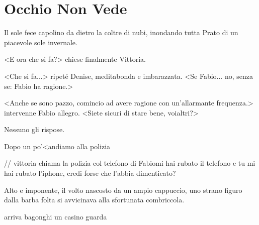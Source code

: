 \chapter{Occhio Non Vede}

Il sole fece capolino da dietro la coltre di nubi, inondando tutta Prato di un piacevole sole invernale.

<E ora che si fa?> chiese finalmente Vittoria.

<Che si fa...> ripeté Denise, meditabonda e imbarazzata. <Se Fabio... no, senza se: Fabio ha ragione.>

<Anche se sono pazzo, comincio ad avere ragione con un'allarmante frequenza.> intervenne Fabio allegro. <Siete sicuri di stare bene, voialtri?>

Nessuno gli rispose.

Dopo un po'<andiamo alla polizia

// vittoria chiama la polizia col telefono di Fabiomi hai rubato il telefono
e tu mi hai rubato l'iphone, credi forse che l'abbia dimenticato?

Alto e imponente, il volto nascosto da un ampio cappuccio, uno strano
figuro dalla barba folta si avvicinava alla sfortunata combriccola.


arriva bagonghi un casino guarda
